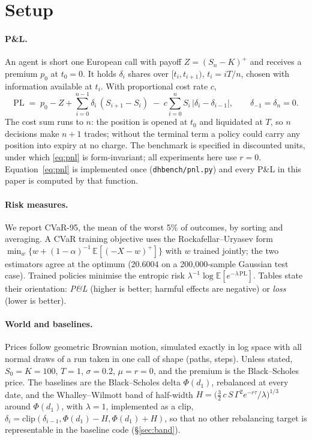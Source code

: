 \documentclass{article}
\newcommand{\cvar}{CVaR-95}
\begin{document}
\section{Setup}\label{sec:setup}

\paragraph{P\&L.} An agent is short one European call with payoff $Z = (S_n - K)^+$ and receives
a premium $p_0$ at $t_0 = 0$. It holds $\delta_i$ shares over $[t_i, t_{i+1})$, $t_i = iT/n$,
chosen with information available at $t_i$. With proportional cost rate $c$,
\begin{equation}\label{eq:pnl}
  \mathrm{PL} \;=\; p_0 - Z + \sum_{i=0}^{n-1} \delta_i \,(S_{i+1} - S_i)
  \;-\; c \sum_{i=0}^{n} S_i \,\lvert \delta_i - \delta_{i-1} \rvert,
  \qquad \delta_{-1} = \delta_n = 0 .
\end{equation}
The cost sum runs to $n$: the position is opened at $t_0$ and liquidated at $T$, so $n$ decisions
make $n+1$ trades; without the terminal term a policy could carry any position into expiry at no
charge. The benchmark is specified in discounted units, under which \eqref{eq:pnl} is
form-invariant; all experiments here use $r = 0$. Equation~\eqref{eq:pnl} is implemented once
(\texttt{dhbench/pnl.py}) and every P\&L in this paper is computed by that function.

\paragraph{Risk measures.} We report \cvar{}, the mean of the worst 5\% of outcomes, by sorting
and averaging. A CVaR training objective uses the Rockafellar--Uryasev form
$\min_w \{ w + (1-\alpha)^{-1}\, \mathbb{E}[(-X - w)^+] \}$ \citep{rockafellar2000optimization}
with $w$ trained jointly; the two estimators agree at the optimum ($20.6004$ on a 200{,}000-sample
Gaussian test case). Trained policies minimise the entropic risk
$\lambda^{-1} \log \mathbb{E}[e^{-\lambda\, \mathrm{PL}}]$. Tables state their orientation:
\emph{P\&L} (higher is better; harmful effects are negative) or \emph{loss} (lower is better).

\paragraph{World and baselines.} Prices follow geometric Brownian motion, simulated exactly in
log space with all normal draws of a run taken in one call of shape (paths, steps). Unless
stated, $S_0 = K = 100$, $T = 1$, $\sigma = 0.2$, $\mu = r = 0$, and the premium is the
Black--Scholes price. The baselines are the Black--Scholes delta $\Phi(d_1)$, rebalanced at every
date, and the Whalley--Wilmott band of half-width
$H = \big(\tfrac{3}{2}\, c\, S\, \Gamma^2 e^{-r\tau} / \lambda\big)^{1/3}$ around $\Phi(d_1)$, with
$\lambda = 1$, implemented as a clip,
$\delta_i = \mathrm{clip}(\delta_{i-1}, \Phi(d_1) - H, \Phi(d_1) + H)$, so that no other
rebalancing target is representable in the baseline code (\S\ref{sec:band}).
\end{document}
